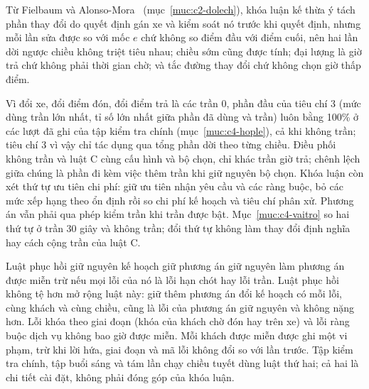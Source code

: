 Từ Fielbaum và Alonso-Mora~\cite{fielbaum2020} (mục~\ref{muc:c2-dolech}), khóa luận kế thừa ý tách phần thay đổi
do quyết định gán xe và kiểm soát nó trước khi quyết định, nhưng mỗi lần sửa được so với mốc $e$ chứ không so điểm
đầu với điểm cuối, nên hai lần dời ngược chiều không triệt tiêu nhau; chiều sớm cũng được tính; đại lượng là giờ
trả chứ không phải thời gian chờ; và tắc đường thay đổi chứ không chọn giờ thấp điểm.

Vì đổi xe, đổi điểm đón, đổi điểm trả là các trần 0, phần đầu của tiêu chí 3 (mức dùng trần lớn nhất, tỉ số lớn
nhất giữa phần đã dùng và trần) luôn bằng 100\% ở các lượt đã ghi của tập kiểm tra chính (mục~\ref{muc:c4-hople}),
cả khi không trần; tiêu chí 3 vì vậy chỉ tác dụng qua tổng phần dời theo từng chiều. Điều phối không trần và luật C
cùng cấu hình và bộ chọn, chỉ khác trần giờ trả; chênh lệch giữa chúng là phần đi kèm việc thêm trần khi giữ nguyên
bộ chọn. Khóa luận còn xét thứ tự ưu tiên chi phí: giữ ưu tiên nhận yêu cầu và các ràng buộc, bỏ các mức xếp
hạng theo ổn định rồi so chi phí kế hoạch và tiêu chí phân xử. Phương án vẫn phải qua phép kiểm trần khi trần
được bật. Mục~\ref{muc:c4-vaitro} so hai thứ tự ở trần 30 giây và không trần; đổi thứ tự không làm thay đổi
định nghĩa hay cách cộng trần của luật C.

Luật phục hồi giữ nguyên kế hoạch giữ phương án giữ nguyên làm phương án được miễn trừ nếu mọi lỗi của nó là lỗi
hạn chót hay lỗi trần. Luật phục hồi không tệ hơn mở rộng luật này: giữ thêm phương án đổi kế hoạch có mỗi lỗi,
cùng khách và cùng chiều, cũng là lỗi của phương án giữ nguyên và không nặng hơn. Lỗi khóa theo giai đoạn (khóa của
khách chờ đón hay trên xe) và lỗi ràng buộc dịch vụ không bao giờ được miễn. Mỗi khách được miễn được ghi một vi
phạm, trừ khi lời hứa, giai đoạn và mã lỗi không đổi so với lần trước. Tập kiểm tra chính, tập buổi sáng và tám
lần chạy chiều tuyết dùng luật thứ hai; cả hai là chi tiết cài đặt, không phải đóng góp của khóa luận.

